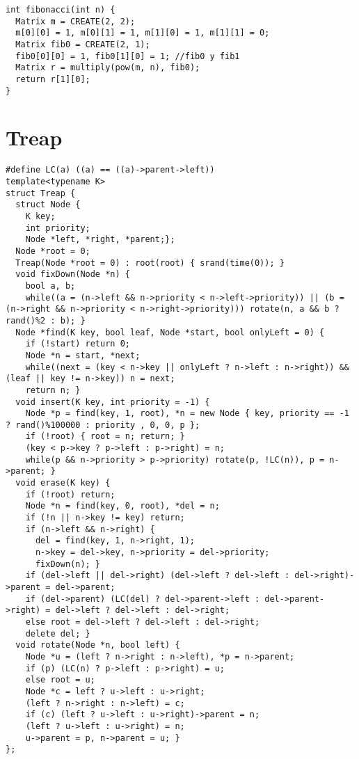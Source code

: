 \documentclass[8pt, oneside]{extarticle}
\begin{document}
\begin{multicols}{3}
\begin{lstlisting}
int fibonacci(int n) {
  Matrix m = CREATE(2, 2);
  m[0][0] = 1, m[0][1] = 1, m[1][0] = 1, m[1][1] = 0;
  Matrix fib0 = CREATE(2, 1);
  fib0[0][0] = 1, fib0[1][0] = 1; //fib0 y fib1
  Matrix r = multiply(pow(m, n), fib0);
  return r[1][0];
}
\end{lstlisting}

\section{Treap}

\begin{lstlisting}
#define LC(a) ((a) == ((a)->parent->left))
template<typename K>
struct Treap {
  struct Node {
    K key;
    int priority;
    Node *left, *right, *parent;};
  Node *root = 0;
  Treap(Node *root = 0) : root(root) { srand(time(0)); }
  void fixDown(Node *n) {
    bool a, b;
    while((a = (n->left && n->priority < n->left->priority)) || (b = (n->right && n->priority < n->right->priority))) rotate(n, a && b ? rand()%2 : b); }
  Node *find(K key, bool leaf, Node *start, bool onlyLeft = 0) {
    if (!start) return 0;
    Node *n = start, *next;
    while((next = (key < n->key || onlyLeft ? n->left : n->right)) && (leaf || key != n->key)) n = next;
    return n; }
  void insert(K key, int priority = -1) {
    Node *p = find(key, 1, root), *n = new Node { key, priority == -1 ? rand()%100000 : priority , 0, 0, p };
    if (!root) { root = n; return; }
    (key < p->key ? p->left : p->right) = n;
    while(p && n->priority > p->priority) rotate(p, !LC(n)), p = n->parent; }
  void erase(K key) {
    if (!root) return;
    Node *n = find(key, 0, root), *del = n;
    if (!n || n->key != key) return;
    if (n->left && n->right) {
      del = find(key, 1, n->right, 1);
      n->key = del->key, n->priority = del->priority;
      fixDown(n); }
    if (del->left || del->right) (del->left ? del->left : del->right)->parent = del->parent;
    if (del->parent) (LC(del) ? del->parent->left : del->parent->right) = del->left ? del->left : del->right;
    else root = del->left ? del->left : del->right;
    delete del; }
  void rotate(Node *n, bool left) {
    Node *u = (left ? n->right : n->left), *p = n->parent;
    if (p) (LC(n) ? p->left : p->right) = u;
    else root = u;
    Node *c = left ? u->left : u->right;
    (left ? n->right : n->left) = c;
    if (c) (left ? u->left : u->right)->parent = n;
    (left ? u->left : u->right) = n;
    u->parent = p, n->parent = u; }
};
\end{lstlisting}


\end{multicols}
\end{document}
